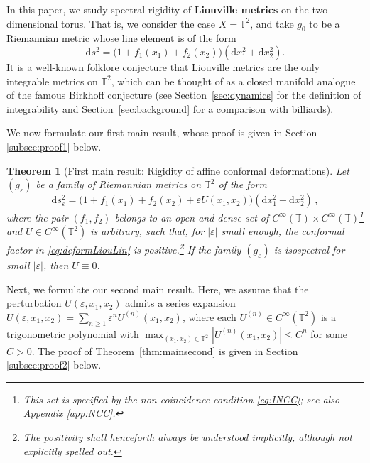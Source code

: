 \documentclass[11pt,letterpaper,oneside]{amsart}
\newcommand{\T}{\mathbb{T}}
\renewcommand{\epsilon}{\varepsilon}
\newtheorem{theo}{Theorem}[section]
\theoremstyle{definition}
\theoremstyle{remark}
\theoremstyle{definition}
\theoremstyle{remark}
\newcommand{\dif}{\mathrm{d}}
\begin{document}
\medskip

In this paper, we study spectral rigidity of \textbf{Liouville metrics} on the two-dimensional torus. That is, we consider the case $X = \T^2$, and take $g_0$ to be a Riemannian metric whose line element is of the form 
\begin{equation}\label{eq:deform}
    \dif s^2 = \big(1 + f_1(x_1) + f_2(x_2)\big) (\dif x_1^2 + \dif x_2^2).
\end{equation}
It is a well-known folklore conjecture that Liouville metrics are the only integrable metrics on $\T^2$, which can be thought of as a closed manifold analogue of the famous Birkhoff conjecture (see Section~\ref{sec:dynamics} for the definition of integrability and Section~\ref{sec:background} for a comparison with billiards).


\medskip

We now formulate
our first main result, whose proof is given in Section \ref{subsec:proof1} below. 



\begin{theo}[First main result: Rigidity of affine conformal deformations] \label{thm:main2}
  Let $(g_\epsilon)$ be a family of Riemannian metrics on $\T^2$ of the form 
  \begin{equation}
      \label{eq:deformLiouLin}
        \dif s^2_\epsilon = \big(1 + f_1(x_1) + f_2(x_2) + \epsilon U(x_1, x_2)\big) (\dif x_1^2 + \dif x_2^2) \,, 
  \end{equation}
  where the pair $(f_1, f_2)$ belongs to an open and dense set of $C^\infty(\T) \times C^\infty(\T)$\footnote{\label{ftn:generic}This set is specified by the \emph{non-coincidence condition} \eqref{eq:INCC}; see also Appendix \ref{app:NCC}.} and $U \in C^\infty(\T^2)$ is arbitrary, such that, for $|\epsilon|$ small enough, the conformal factor in \eqref{eq:deformLiouLin} is positive.\footnote{The positivity shall henceforth always be understood implicitly, although not explicitly spelled out.} If the family $(g_\epsilon)$ is isospectral for small $|\epsilon|$, then $U \equiv 0$.
\end{theo}


Next, we formulate our second main result. Here, we assume that the perturbation $U(\epsilon, x_1, x_2)$ admits a series expansion $U(\epsilon, x_1, x_2) = \sum_{n \ge 1} \epsilon^n U^{(n)}(x_1, x_2)$, where each $U^{(n)} \in C^\infty(\T^2)$ is a trigonometric polynomial with $\max_{(x_1, x_2) \in \T^2} |U^{(n)}(x_1, x_2)| \le C^n $ for some $C > 0$. The proof of Theorem~\ref{thm:mainsecond} is given in Section \ref{subsec:proof2} below. 
\end{document}
